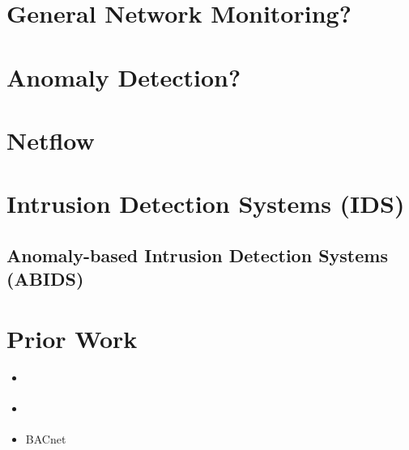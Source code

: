 
\section{General Network Monitoring?}

\section{Anomaly Detection?}

\section{Netflow}

\section{Intrusion Detection Systems (IDS)}

\subsection{Anomaly-based Intrusion Detection Systems (ABIDS)}

\section{Prior Work}

\begin{itemize}
	\item \parencite{Yang2006}
	\item \parencite{Celeda2012}
	\item \parencite{Pan2014} BACnet
\end{itemize}